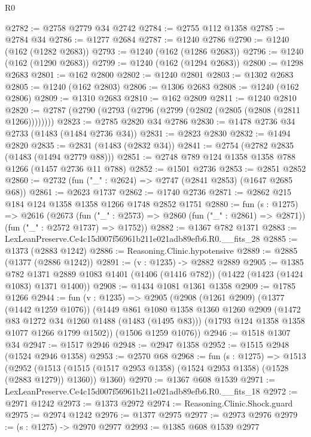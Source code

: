 \begin{lexlean}{R0}
\begin{coremodule}
@2782 := @2758 @2779 @34 @2742
@2784 := @2755 @112 @1358
@2785 := @2784 @34
@2786 := @1277 @2684
@2787 := @1240 @2786
@2790 := @1240 (@162 (@1282 @2683))
@2793 := @1240 (@162 (@1286 @2683))
@2796 := @1240 (@162 (@1290 @2683))
@2799 := @1240 (@162 (@1294 @2683))
@2800 := @1298 @2683
@2801 := @162 @2800
@2802 := @1240 @2801
@2803 := @1302 @2683
@2805 := @1240 (@162 @2803)
@2806 := @1306 @2683
@2808 := @1240 (@162 @2806)
@2809 := @1310 @2683
@2810 := @162 @2809
@2811 := @1240 @2810
@2820 := @2787 (@2790 (@2793 (@2796 (@2799 (@2802 (@2805 (@2808 (@2811 @1266))))))))
@2823 := @2785 @2820 @34 @2786
@2830 := @1478 @2736 @34 @2733 (@1483 (@1484 @2736 @34))
@2831 := @2823 @2830
@2832 := @1494 @2820
@2835 := @2831 (@1483 (@2832 @34))
@2841 := @2754 (@2782 @2835 (@1483 (@1494 @2779 @88)))
@2851 := @2748 @789 @124 @1358 @1358 @788 @1266 (@1457 @2736 @11 @788)
@2852 := @1501 @2736
@2853 := @2851 @2852
@2860 := @2732 (fun ("_" : @2624) => @2747 (@2841 @2853) (@1647 @2685 @68))
@2861 := @2623 @1737
@2862 := @1740 @2736
@2871 := @2862 @215 @184 @124 @1358 @1358 @1266 @1748 @2852 @1751
@2880 := fun (s : @1275) =>
  @2616
    (@2673
      (fun ("_" : @2573) => @2860 (fun ("_" : @2861) => @2871))
      (fun ("_" : @2572 @1737) => @1752))
@2882 := @1367 @782 @1371
@2883 := LexLeanPreserve.Ce4c15d007f56961b211e021adb89efb6.R0.__fits_28
@2885 := @1373 (@2883 @1242)
@2886 := Reasoning.Clinic.hypotensive
@2889 := @2885 (@1377 (@2886 @1242))
@2891 := (v : @1235) -> @2882 @2889
@2905 := @1385
    @782
    @1371
    @2889
    @1083
    @1401
    (@1406 (@1416 @782))
    (@1422 (@1423 (@1424 @1083) @1371 @1400))
@2908 := @1434 @1081 @1361 @1358
@2909 := @1785 @1266
@2944 := fun (v : @1235) =>
  @2905
    (@2908
      (@1261 @2909)
      (@1377 (@1442 @1259 @1076))
      (@1449
        @861
        @1080
        @1358
        @1360
        @1260
        @2909
        (@1472 @83 @1272 @34 @1260 @1488 (@1483 (@1495 @83)))
        (@1793 @124 @1358 @1358 @1077 @1266 @1799 @1502))
      (@1506 @1259 @1076))
@2946 := @1518 @1307 @34
@2947 := @1517 @2946
@2948 := @2947 @1358
@2952 := @1515 @2948 (@1524 @2946 @1358)
@2953 := @2570 @68
@2968 := fun (s : @1275) =>
  @1513
    (@2952
      (@1513 (@1515 (@1517 @2953 @1358) (@1524 @2953 @1358) (@1528 (@2883 @1279)) @1360))
      @1360)
@2970 := @1367 @608 @1539
@2971 := LexLeanPreserve.Ce4c15d007f56961b211e021adb89efb6.R0.__fits_18
@2972 := @2971 @1242
@2973 := @1373 @2972
@2974 := Reasoning.Clinic.Shock.guard
@2975 := @2974 @1242
@2976 := @1377 @2975
@2977 := @2973 @2976
@2979 := (s : @1275) -> @2970 @2977
@2993 := @1385
    @608
    @1539
    @2977

\end{coremodule}
\end{lexlean}
